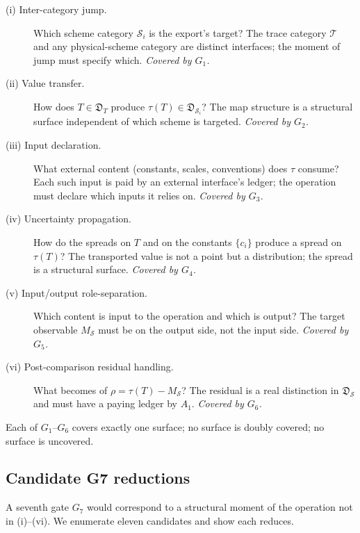 \begin{description}
\item[(i) Inter-category jump.] Which scheme category $\mathcal{S}_i$ is the export's target? The trace category $\mathcal{T}$ and any physical-scheme category are distinct interfaces; the moment of jump must specify which. \emph{Covered by $G_1$.}
\item[(ii) Value transfer.] How does $T \in \mathfrak{D}_T$ produce $\tau(T) \in \mathfrak{D}_{\mathcal{S}_i}$? The map structure is a structural surface independent of which scheme is targeted. \emph{Covered by $G_2$.}
\item[(iii) Input declaration.] What external content (constants, scales, conventions) does $\tau$ consume? Each such input is paid by an external interface's ledger; the operation must declare which inputs it relies on. \emph{Covered by $G_3$.}
\item[(iv) Uncertainty propagation.] How do the spreads on $T$ and on the constants $\{c_i\}$ produce a spread on $\tau(T)$? The transported value is not a point but a distribution; the spread is a structural surface. \emph{Covered by $G_4$.}
\item[(v) Input/output role-separation.] Which content is input to the operation and which is output? The target observable $M_{\mathcal{S}}$ must be on the output side, not the input side. \emph{Covered by $G_5$.}
\item[(vi) Post-comparison residual handling.] What becomes of $\rho = \tau(T) - M_{\mathcal{S}}$? The residual is a real distinction in $\mathfrak{D}_{\mathcal{S}}$ and must have a paying ledger by $A_1$. \emph{Covered by $G_6$.}
\end{description}

Each of $G_1$--$G_6$ covers exactly one surface; no surface is doubly covered; no surface is uncovered.

\subsection{Candidate G7 reductions}
\label{subsec:G7-candidates}

A seventh gate $G_7$ would correspond to a structural moment of the operation not in (i)--(vi). We enumerate eleven candidates and show each reduces.

